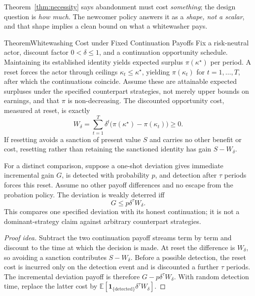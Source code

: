 \documentclass[11pt,a4paper]{article}
\theoremstyle{definition}
\begin{document}
\noindent Theorem~\ref{thm:necessity} says abandonment must cost \emph{something};
the design question is \emph{how much}. The newcomer policy answers it as a
\emph{shape, not a scalar}, and that shape implies a clean bound on what a
whitewasher pays.

\begin{pdclaim}{Theorem}{Whitewashing Cost under Fixed Continuation Payoffs}
\setlength{\parskip}{4pt plus 1pt}
\label{thm:whitewash-cost}
Fix a risk-neutral actor, discount factor $0<\delta\le1$, and a continuation
opportunity schedule. Maintaining its established identity yields expected
surplus $\pi(\kappa^\star)$ per period. A reset forces the actor through
ceilings $\kappa_t\le\kappa^\star$, yielding $\pi(\kappa_t)$ for
$t=1,\ldots,T$, after which the continuations coincide. Assume these are
attainable expected surpluses under the specified counterpart strategies,
not merely upper bounds on earnings, and that $\pi$ is non-decreasing.
The discounted opportunity cost, measured at reset, is exactly
\[
W_\delta=\sum_{t=1}^{T}\delta^t
 \bigl(\pi(\kappa^\star)-\pi(\kappa_t)\bigr)\ge0.
\]
If resetting avoids a sanction of present value $S$ and carries no other
benefit or cost, resetting rather than retaining the sanctioned identity
has gain $S-W_\delta$.

For a distinct comparison, suppose a one-shot deviation gives immediate
incremental gain $G$, is detected with probability $p$, and detection after
$\tau$ periods forces this reset. Assume no other payoff differences and
no escape from the probation policy. The deviation is weakly deterred iff
\[
 G\le p\delta^\tau W_\delta.
\]
This compares one specified deviation with its honest continuation; it is
not a dominant-strategy claim against arbitrary counterpart strategies.
\end{pdclaim}
\begin{proof}[Proof idea]
Subtract the two continuation payoff streams term by term and discount to
the time at which the decision is made. At reset the difference is
$W_\delta$, so avoiding a sanction contributes $S-W_\delta$. Before a
possible detection, the reset cost is incurred only on the detection event
and is discounted a further $\tau$ periods. The incremental deviation
payoff is therefore $G-p\delta^\tau W_\delta$. With random detection time,
replace the latter cost by
$\mathbb E[\mathbf1_{\{\mathrm{detected}\}}\delta^\tau W_\delta]$.
\end{proof}
\end{document}
